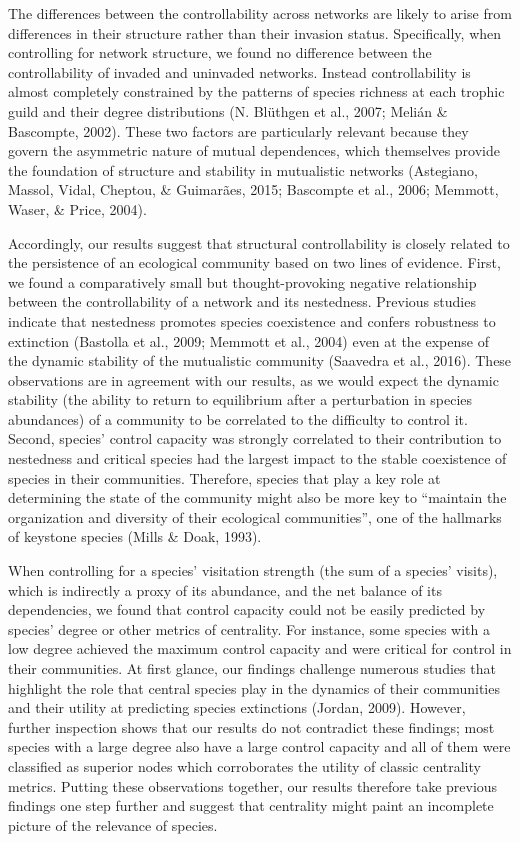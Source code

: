 \documentclass[a4paper]{artikel1}
\newcommand{\R}[1]{\label{#1}\linelabel{#1}}
\theoremstyle{definition}
\theoremstyle{definition}
\theoremstyle{definition}
\theoremstyle{remark}
\begin{document}
The differences between the controllability across networks are likely
to arise from differences in their structure rather than their invasion
status. Specifically, when controlling for network structure, we found
no difference between the controllability of invaded and uninvaded
networks. Instead controllability is almost completely constrained by
the patterns of species richness at each trophic guild and their degree
distributions (N. Blüthgen et al., 2007; Melián \& Bascompte, 2002).
These two factors are particularly relevant because they govern the
asymmetric nature of mutual dependences, which themselves provide the
foundation of structure and stability in mutualistic networks
(Astegiano, Massol, Vidal, Cheptou, \& Guimarães, 2015; Bascompte et
al., 2006; Memmott, Waser, \& Price, 2004).

\R{R2-dynamic-persistence}Accordingly, our results suggest that
structural controllability is closely related to the persistence of an
ecological community based on two lines of evidence. First, we found a
comparatively small but thought-provoking negative relationship between
the controllability of a network and its nestedness. Previous studies
indicate that nestedness promotes species coexistence and confers
robustness to extinction (Bastolla et al., 2009; Memmott et al., 2004)
even at the expense of the dynamic stability of the mutualistic
community (Saavedra et al., 2016). These observations are in agreement
with our results, as we would expect the dynamic stability
\R{R2-dynamic-stability}(the ability to return to equilibrium after a
perturbation in species abundances) of a community to be correlated to
the difficulty to control it. Second, species' control capacity was
strongly correlated to their contribution to nestedness and critical
species had the largest impact to the stable coexistence of species in
their communities. Therefore, species that play a key role at
determining the state of the community might also be more key to
``maintain the organization and diversity of their ecological
communities'', one of the hallmarks of keystone species (Mills \& Doak,
1993).

When controlling for a \R{R2-species-strength-b}species' visitation
strength (the sum of a species' visits), which is indirectly a proxy of
its abundance, and the net balance of its dependencies, we found that
control capacity could not be easily predicted by species' degree or
other metrics of centrality. For instance, some species with a low
degree achieved the maximum control capacity and were critical for
control in their communities. At first glance, our findings challenge
numerous studies that highlight the role that central species play in
the dynamics of their communities and their utility at predicting
species extinctions (Jordan, 2009). However, further inspection shows
that our results do not contradict these findings; most species with a
large degree also have a large control capacity and all of them were
classified as superior nodes which corroborates the utility of classic
centrality metrics. Putting these observations together, our results
therefore take previous findings one step further and suggest that
centrality might paint an incomplete picture of the relevance of
species.
\end{document}
